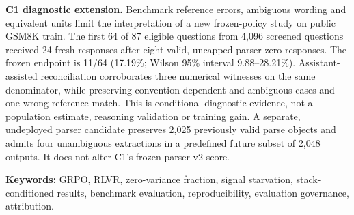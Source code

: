 \textbf{C1 diagnostic extension.} Benchmark reference errors, ambiguous wording and equivalent units limit the interpretation of a new frozen-policy study on public GSM8K train. The first 64 of 87 eligible questions from 4,096 screened questions received 24 fresh responses after eight valid, uncapped parser-zero responses. The frozen endpoint is 11/64 (17.19\%; Wilson 95\% interval 9.88--28.21\%). Assistant-assisted reconciliation corroborates three numerical witnesses on the same denominator, while preserving convention-dependent and ambiguous cases and one wrong-reference match. This is conditional diagnostic evidence, not a population estimate, reasoning validation or training gain. A separate, undeployed parser candidate preserves 2,025 previously valid parse objects and admits four unambiguous extractions in a predefined future subset of 2,048 outputs. It does not alter C1's frozen parser-v2 score.

\vspace{0.25in}
\noindent\textbf{Keywords:} GRPO, RLVR, zero-variance fraction, signal
starvation, stack-conditioned results, benchmark evaluation, reproducibility,
evaluation governance, attribution.

\tableofcontents
\listoffigures
\listoftables
